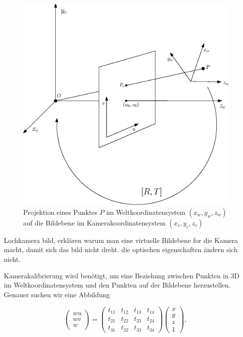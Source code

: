 \begin{figure}[!htb]
	\centering
	\includegraphics[scale=.8]{images/pinhole.eps}
	\caption{Projektion eines Punktes $P$ im Weltkoordinatensystem $(x_w, y_w, z_w)$ auf die Bildebene im Kamerakoordinatensystem  $(x_c, y_c, z_c)$}
	\label{fig:pinhole}
\end{figure}

Lochkamera bild, erklären warum man eine virtuelle Bildebene for die Kamera macht, damit sich das bild nicht dreht. die optischen eigenschaften ändern sich nicht.

Kamerakalibrierung wird benötigt, um eine Beziehung zwischen Punkten in 3D im Weltkoordinatensystem und den Punkten auf der Bildebene herzustellen. Genauer suchen wir eine Abbildung 

\begin{equation}
	\begin{pmatrix}
	wu \\wv \\w 
	\end{pmatrix} = 
		\begin{pmatrix}
		t_{11} & t_{12} & t_{13} & t_{14} \\
		t_{21} & t_{22} & t_{23} & t_{24} \\
		t_{31} & t_{32} & t_{33} & t_{34} 
		\end{pmatrix} 	\begin{pmatrix}
		x \\y \\z \\ 1 
		\end{pmatrix},
\end{equation}

